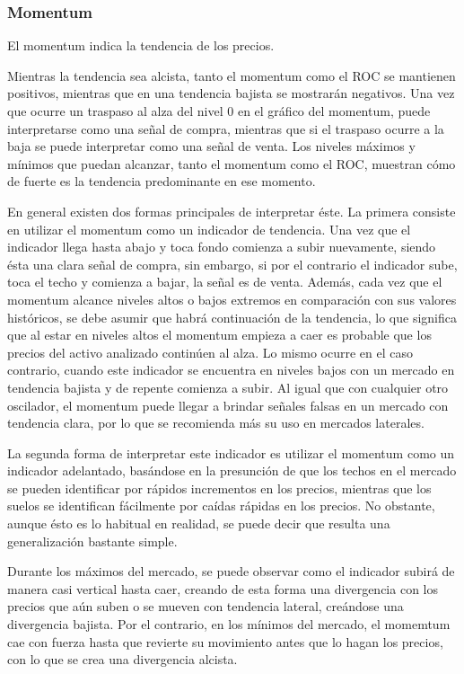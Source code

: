 
\pagebreak


\subsubsection*{Momentum}
El momentum indica la tendencia de los precios.

Mientras la tendencia sea alcista, tanto el momentum como el ROC se mantienen positivos, mientras que en una tendencia bajista se mostrarán negativos. Una vez que ocurre un traspaso al alza del nivel 0 en el gráfico del momentum, puede interpretarse como una señal de compra, mientras que si el traspaso ocurre a la baja se puede interpretar como una señal de venta. Los niveles máximos y mínimos que puedan alcanzar, tanto el momentum como el ROC, muestran cómo de fuerte es la tendencia predominante en ese momento.

En general existen dos formas principales de interpretar éste. La primera consiste en utilizar el momentum como un indicador de tendencia.
Una vez que el indicador llega hasta abajo y toca fondo  comienza a subir nuevamente, siendo ésta una clara señal de compra, sin embargo, si por el contrario el indicador sube, toca el techo y comienza a bajar, la señal es de venta. Además, cada vez que el momentum alcance niveles altos o bajos extremos en comparación con sus valores históricos, se debe asumir que habrá continuación de la tendencia, lo que significa que al estar en niveles altos el momentum empieza a caer es probable que los precios del activo analizado continúen al alza. Lo mismo ocurre en el caso contrario, cuando este indicador se encuentra en niveles  bajos con un mercado en tendencia bajista y de repente comienza a subir. Al igual que con cualquier otro oscilador, el momentum puede llegar a brindar señales falsas en un mercado con tendencia clara, por lo que se recomienda más su uso en mercados laterales.

La segunda forma de interpretar este indicador es utilizar  el momentum como un indicador adelantado, basándose en la presunción de que los techos en el mercado se pueden identificar por rápidos incrementos en los precios, mientras que los suelos se identifican fácilmente por caídas rápidas en los precios. No obstante, aunque ésto es lo habitual en realidad, se puede decir que resulta una generalización bastante simple.

Durante los máximos del mercado, se puede observar como el indicador subirá de manera casi vertical hasta caer, creando de esta forma una divergencia con los precios que aún suben o se mueven con tendencia lateral, creándose una divergencia bajista. Por el contrario, en los mínimos del mercado, el momemtum cae con fuerza hasta que revierte su movimiento antes que lo hagan los precios, con lo que se crea una divergencia alcista.

